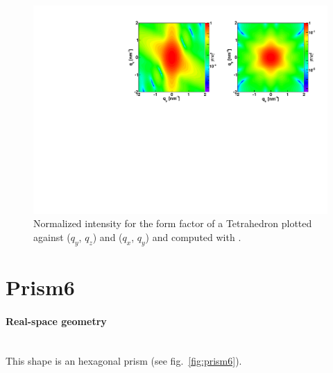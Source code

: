 \begin{figure}[ht]
\begin{center}
\includegraphics[angle=-90,width=\textwidth]{Figures/ff/figfftetrahedron.pdf}
\end{center}
\caption{Normalized intensity for the form factor of a Tetrahedron
  plotted against ($q_y$, $q_z$) and  ($q_x$, $q_y$) and
  computed with .}
\label{fig:FFtetrahEx}
\end{figure}


\newpage
\section{Prism6} 

\paragraph{Real-space geometry}\mbox{}\\
This shape is an hexagonal prism (see fig.~\ref{fig:prism6}).

